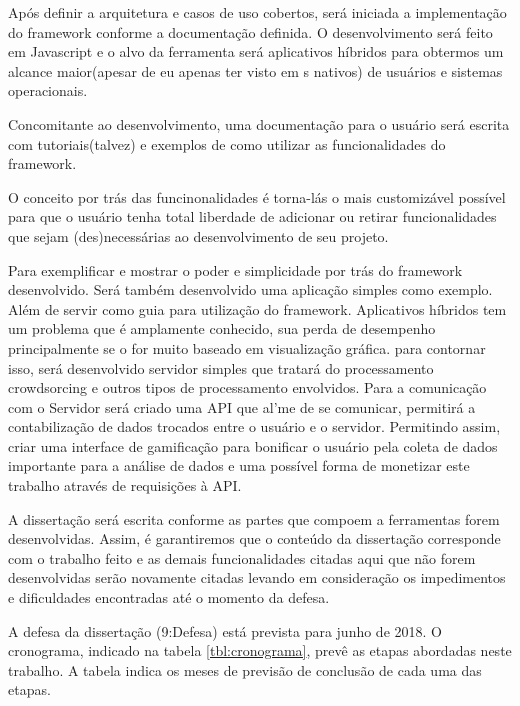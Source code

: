 \documentclass[12pt]{report} %
\begin{document}
Após definir a arquitetura e casos de uso cobertos, será iniciada a implementação do framework conforme a documentação definida. O desenvolvimento será feito em Javascript e o alvo da ferramenta será aplicativos híbridos para obtermos um alcance maior(apesar de eu apenas ter visto em s nativos) de usuários e sistemas operacionais.  

Concomitante ao desenvolvimento, uma documentação para o usuário será escrita com tutoriais(talvez) e exemplos de como utilizar as funcionalidades do framework. 

O conceito por trás das funcinonalidades é torna-lás o mais customizável possível para que o usuário tenha total liberdade de adicionar ou retirar funcionalidades que sejam (des)necessárias ao desenvolvimento de seu projeto. 

Para exemplificar e mostrar o poder e simplicidade por trás do framework desenvolvido. Será também desenvolvido uma aplicação simples como exemplo. Além de servir como guia para utilização do framework. Aplicativos híbridos tem um problema que é amplamente conhecido, sua perda de desempenho principalmente se o  for muito baseado em visualização gráfica. para contornar isso, será desenvolvido servidor simples que tratará do processamento crowdsorcing e outros tipos de processamento envolvidos. Para a comunicação com o Servidor será criado uma API que al'me de se comunicar, permitirá a contabilização de dados trocados entre o usuário e o servidor. Permitindo assim, criar uma interface de gamificação para bonificar o usuário pela coleta de dados importante para a análise de dados e uma possível forma de monetizar este trabalho através de requisições à API.

A dissertação será escrita conforme as partes que compoem a ferramentas forem desenvolvidas. Assim, é garantiremos que o conteúdo da dissertação corresponde com o trabalho feito e as demais funcionalidades citadas aqui que não forem desenvolvidas serão novamente citadas levando em consideração os impedimentos e dificuldades encontradas até o momento da defesa.

A defesa da dissertação (9:Defesa) está prevista para junho de 2018. O cronograma, indicado na tabela \ref{tbl:cronograma}, prevê as etapas abordadas neste trabalho. A tabela indica os meses de previsão de conclusão de cada uma das etapas.
\end{document}
